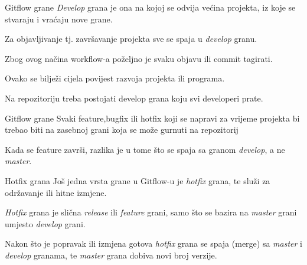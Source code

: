 \documentclass[10pt]{beamer}
\begin{document}
\begin{frame}{Gitflow grane}
\textit{Develop} grana je ona na kojoj se odvija većina projekta, iz koje se stvaraju i vraćaju nove grane.

Za objavljivanje tj. završavanje projekta sve se spaja u \textit{develop} granu.

Zbog ovog načina workflow-a poželjno je svaku objavu ili commit tagirati.

Ovako se bilježi cijela povijest razvoja projekta ili programa.

Na repozitoriju treba postojati develop grana koju svi developeri prate.

\end{frame}
\begin{frame}{Gitflow grane}
Svaki feature,bugfix ili hotfix koji se napravi za vrijeme projekta bi trebao biti na zasebnoj grani koja se može gurnuti na repozitorij

Kada se feature završi, razlika je u tome što se spaja sa granom \textit{develop}, a ne \textit{master}.

{
\setlength{\fboxsep}{1pt}
\setlength{\fboxrule}{1pt}
}
\end{frame}
\begin{frame}{Hotfix grana}
Još jedna vrsta grane u Gitflow-u je \textit{hotfix} grana, te služi za održavanje ili hitne izmjene.

\textit{Hotfix} grana je slična \textit{release} ili \textit{feature} grani, samo što se bazira na \textit{master} grani umjesto \textit{develop} grani.

Nakon što je popravak ili izmjena gotova \textit{hotfix} grana se spaja (merge) sa \textit{master} i \textit{develop} granama, te \textit{master} grana dobiva novi broj verzije.
{
\setlength{\fboxsep}{1pt}
\setlength{\fboxrule}{1pt}
}
\end{frame}
\end{document}

